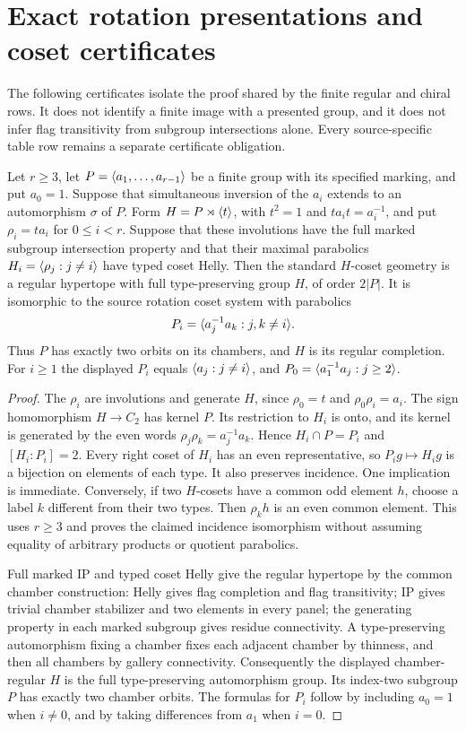 \section{Exact rotation presentations and coset certificates}
The following certificates isolate the proof shared by the finite regular and chiral rows. It does not
identify a finite image with a presented group, and it does not infer flag
transitivity from subgroup intersections alone. Every source-specific table row remains a separate certificate obligation.

\begin{proposition}
Let $r\geq3$, let $P=\langle a_1,\ldots,a_{r-1}\rangle$ be a finite group with its
specified marking, and put $a_0=1$. Suppose that simultaneous inversion of the
$a_i$ extends to an automorphism $\sigma$ of $P$. Form
$H=P\rtimes\langle t\rangle$, with $t^2=1$ and $t a_i t=a_i^{-1}$, and put
$\rho_i=t a_i$ for $0\leq i<r$. Suppose that these involutions have the full
marked subgroup intersection property and that their maximal parabolics
$H_i=\langle\rho_j:j\ne i\rangle$ have typed coset Helly.
Then the standard $H$-coset geometry is a regular hypertope with full
type-preserving group $H$, of order $2|P|$. It is isomorphic to the source
rotation coset system with parabolics
\[
 P_i=\langle a_j^{-1}a_k:j,k\ne i\rangle.
\]
Thus $P$ has exactly two orbits on its chambers, and $H$ is its regular
completion. For $i\geq1$ the displayed $P_i$ equals
$\langle a_j:j\ne i\rangle$, and $P_0=\langle a_1^{-1}a_j:j\geq2\rangle$.
\end{proposition}
\begin{proof}
The $\rho_i$ are involutions and generate $H$, since $\rho_0=t$ and
$\rho_0\rho_i=a_i$. The sign homomorphism $H\to C_2$ has kernel $P$.
Its restriction to $H_i$ is onto, and its kernel is generated by the even
words $\rho_j\rho_k=a_j^{-1}a_k$. Hence $H_i\cap P=P_i$ and
$[H_i:P_i]=2$.
Every right coset of $H_i$ has an even representative, so $P_i g\mapsto H_i g$
is a bijection on elements of each type. It also preserves incidence.
One implication is immediate. Conversely, if two $H$-cosets have a common
odd element $h$, choose a label $k$ different from their two types. Then
$\rho_k h$ is an even common element. This uses $r\geq3$ and proves the
claimed incidence isomorphism without assuming equality of arbitrary products
or quotient parabolics.

Full marked IP and typed coset Helly give the regular hypertope by the common
chamber construction: Helly gives flag completion and flag transitivity; IP gives
trivial chamber stabilizer and two elements in every panel; the generating
property in each marked subgroup gives residue connectivity. A type-preserving
automorphism fixing a chamber fixes each adjacent chamber by thinness, and then
all chambers by gallery connectivity. Consequently the displayed chamber-regular
$H$ is the full type-preserving automorphism group. Its index-two subgroup $P$
has exactly two chamber orbits. The formulas for $P_i$ follow by including
$a_0=1$ when $i\ne0$, and by taking differences from $a_1$ when $i=0$.
\end{proof}

